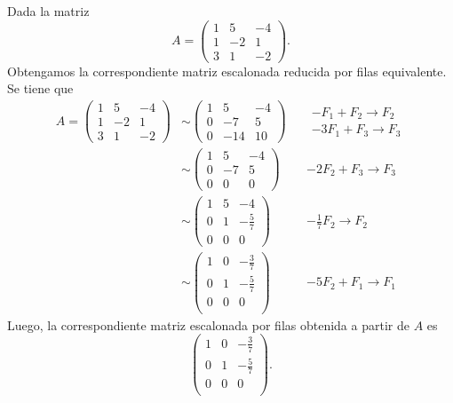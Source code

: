 \documentclass[compacto,10pt]{pubciencias-notas}
\begin{document}
\begin{ejem}\label{Ejem:EPF2}\hspace{0pt} Dada la matriz
\[
    A=\begin{pmatrix}
    1&5&-4\\
    1&-2&1\\
    3&1&-2
    \end{pmatrix}.
\]
Obtengamos la correspondiente matriz escalonada reducida por filas equivalente. Se tiene que
\begin{align*}
A=\begin{pmatrix}
1&5&-4\\
1&-2&1\\
3&1&-2
\end{pmatrix}
& \sim 
\begin{pmatrix}
1&5&-4\\
0&-7&5\\
0&-14&10
\end{pmatrix}
&& \begin{array}{c}
    -F_1+F_2\rightarrow F_2\\
    -3F_1+F_3\rightarrow F_3
\end{array}\\
& \sim 
\begin{pmatrix}
1&5&-4\\
0&-7&5\\
0&0&0
\end{pmatrix}
&& -2F_2+F_3\rightarrow F_3\\
& \sim 
\begin{pmatrix}
1&5&-4\\
0&1&-\frac{5}{7}\\
0&0&0
\end{pmatrix}
&& -\frac{1}{7}F_2\rightarrow F_2\\
& \sim
\begin{pmatrix}
1&0&-\frac{3}{7}\\
0&1&-\frac{5}{7}\\
0&0&0\\
\end{pmatrix}
&&-5F_2+F_1\rightarrow F_1
\end{align*}
Luego, la correspondiente matriz escalonada por filas obtenida a partir de $A$ es
\[
    \begin{pmatrix}
    1&0&-\frac{3}{7}\\
    0&1&-\frac{5}{7}\\
    0&0&0\\
    \end{pmatrix}.
\]
\end{ejem}
\end{document}
